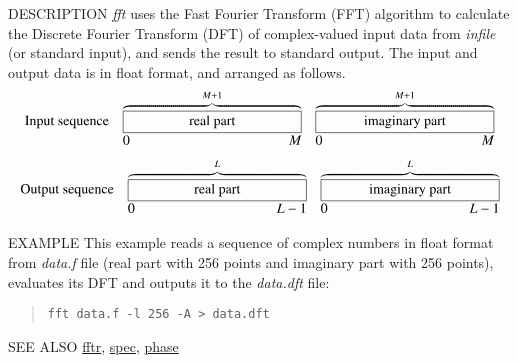 \begin{synopsis}
\item[fft] [ --l $L$ ] [ --m $M$] [ --\{ A $|$ R $|$ I $|$ P \} ] 
	   [ {\em infile} ] 
\end{synopsis}

\begin{qsection}{DESCRIPTION}
{\em fft} uses the Fast Fourier Transform (FFT) algorithm 
to calculate the Discrete Fourier Transform (DFT) 
of complex-valued input data from {\em infile} (or standard input), 
and sends the result to standard output. 
The input and output data is in float format, and arranged as follows.
\[
 \begin{array}{lll}
\mbox{Input sequence} & \overbrace{\framebox[4.5cm]{real part}}^{M+1} &
	   \overbrace{\framebox[4.5cm]{imaginary part}}^{M+1} \\
		& \makebox[4.5cm]{0\hfill $M$} &
		\makebox[4.5cm]{0\hfill $M$}
\end{array}
\]
\[
\begin{array}{lll}
\mbox{Output sequence} & \overbrace{\framebox[4.5cm]{real part}}^{L} &
	   \overbrace{\framebox[4.5cm]{imaginary part}}^{L} \\
		& \makebox[4.5cm]{0\hfill $L-1$} &
		\makebox[4.5cm]{0\hfill $L-1$}
\end{array}
\]
\end{qsection}

\begin{options}
\end{options}

\begin{qsection}{EXAMPLE}
This example reads a sequence of complex numbers in float format from
{\em data.f} file (real part with 256 points and imaginary part with
256 points), evaluates its DFT and outputs it to the {\em data.dft} file:
\begin{quote}
  \verb!fft data.f -l 256 -A > data.dft!
\end{quote}
\end{qsection}

\begin{qsection}{SEE ALSO}
\hyperlink{fftr}{fftr},
\hyperlink{spec}{spec},
\hyperlink{phase}{phase}
\end{qsection}
